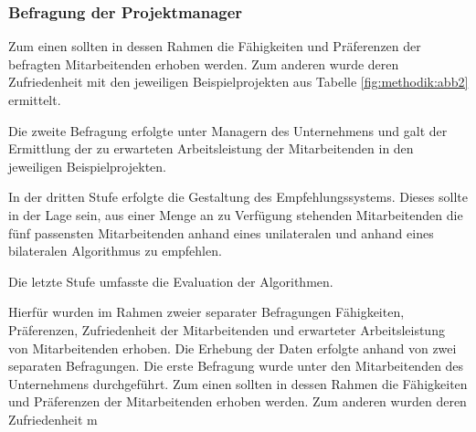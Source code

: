 
\subsubsection{Befragung der Projektmanager}

Zum einen sollten in dessen Rahmen die Fähigkeiten und Präferenzen der befragten Mitarbeitenden erhoben werden.
Zum anderen wurde deren Zufriedenheit mit den jeweiligen Beispielprojekten aus Tabelle \ref{fig:methodik:abb2} ermittelt.

Die zweite Befragung erfolgte unter Managern des Unternehmens und galt der Ermittlung der zu erwarteten Arbeitsleistung der Mitarbeitenden in den jeweiligen Beispielprojekten.

In der dritten Stufe erfolgte die Gestaltung des Empfehlungssystems.
Dieses sollte in der Lage sein, aus einer Menge an zu Verfügung stehenden Mitarbeitenden die fünf passensten Mitarbeitenden anhand eines unilateralen und anhand eines bilateralen Algorithmus zu empfehlen.

Die letzte Stufe umfasste die Evaluation der Algorithmen.


Hierfür wurden im Rahmen zweier separater Befragungen Fähigkeiten, Präferenzen, Zufriedenheit der Mitarbeitenden und erwarteter Arbeitsleistung von Mitarbeitenden erhoben.
Die Erhebung der Daten erfolgte anhand von zwei separaten Befragungen.
Die erste Befragung wurde unter den Mitarbeitenden des Unternehmens durchgeführt.
Zum einen sollten in dessen Rahmen die Fähigkeiten und Präferenzen der Mitarbeitenden erhoben werden.
Zum anderen wurden deren Zufriedenheit m



